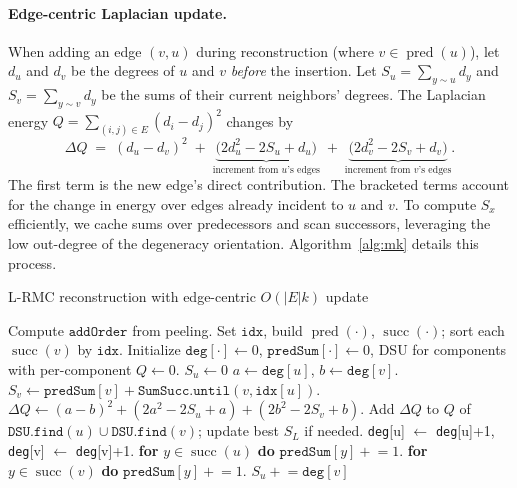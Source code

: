 \documentclass{article} %
\DeclareMathOperator{\pred}{pred}
\DeclareMathOperator{\succset}{succ}  %
\theoremstyle{remark}
\begin{document}
\paragraph{Edge-centric Laplacian update.}
When adding an edge \((v,u)\) during reconstruction (where \(v\in\pred(u)\)), let \(d_u\) and \(d_v\) be the degrees of \(u\) and \(v\) \emph{before} the insertion. Let \(S_u=\sum_{y\sim u} d_y\) and \(S_v=\sum_{y\sim v} d_y\) be the sums of their current neighbors’ degrees. The Laplacian energy
$Q=\sum_{(i,j)\in E}(d_i-d_j)^2$ changes by
\begin{equation}
\label{eq:deltaQ}
\Delta Q \;=\; (d_u-d_v)^2 \;+\; \underbrace{\big(2d_u^2 - 2S_u + d_u\big)}_{\text{increment from \(u\)'s edges}} \;+\; \underbrace{\big(2d_v^2 - 2S_v + d_v\big)}_{\text{increment from \(v\)'s edges}}.
\end{equation}
The first term is the new edge's direct contribution. The bracketed terms account for the change in energy over edges already incident to \(u\) and \(v\). To compute \(S_x\) efficiently, we cache sums over predecessors and scan successors, leveraging the low out-degree of the degeneracy orientation. Algorithm~\ref{alg:mk} details this process.


\begin{algorithm}[t]
\caption{L-RMC reconstruction with edge-centric \(O(|E|k)\) update}
\label{alg:mk}
\begin{algorithmic}[1]
\STATE Compute \(\texttt{addOrder}\) from peeling. Set \(\texttt{idx}\), build \(\pred(\cdot)\), \(\succset(\cdot)\); sort each \(\succset(v)\) by \(\texttt{idx}\).
\STATE Initialize \(\texttt{deg}[\cdot]\gets 0\), \(\texttt{predSum}[\cdot]\gets 0\), DSU for components with per-component \(Q\gets 0\).
 \label{line:for-u}
  \STATE \(S_u \gets 0\) 
  \FOR{\(v \in \pred(u)\)}
    \STATE \(a\gets \texttt{deg}[u]\), \(b\gets \texttt{deg}[v]\).
    \STATE \(S_v \gets \texttt{predSum}[v] + \texttt{SumSucc.until}(v,\texttt{idx}[u])\).
    \STATE \(\Delta Q \gets (a-b)^2 + (2a^2 - 2S_u + a) + (2b^2 - 2S_v + b)\).
    \STATE Add \(\Delta Q\) to \(Q\) of \(\texttt{DSU.find}(u)\cup\texttt{DSU.find}(v)\); update best \(S_L\) if needed.
    \STATE \texttt{deg}[u] $\leftarrow$ \texttt{deg}[u]+1, \texttt{deg}[v] $\leftarrow$ \texttt{deg}[v]+1.
    \STATE \textbf{for} \(y\in\succset(u)\) \textbf{do} \(\texttt{predSum}[y]\mathrel{+}=1\). \textbf{for} \(y\in\succset(v)\) \textbf{do} \(\texttt{predSum}[y]\mathrel{+}=1\). \label{line:push}
    \STATE \(S_u \mathrel{+}= \texttt{deg}[v]\) 
  \ENDFOR
\ENDFOR
\end{algorithmic}
\end{algorithm}
\end{document}
